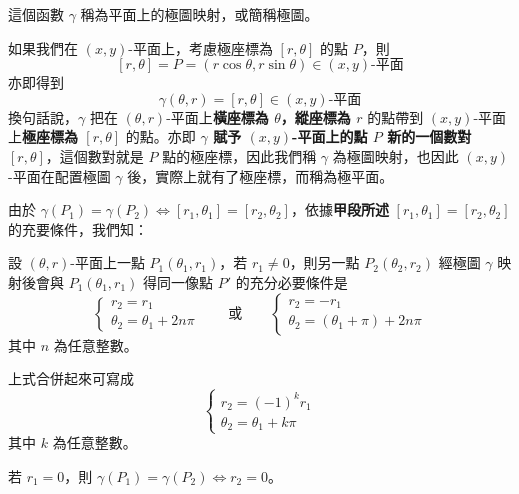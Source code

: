 這個函數 $\gamma$ 稱為平面上的極圖映射，或簡稱極圖。

如果我們在 $(x, y)$-平面上，考慮極座標為 $[r, \theta]$ 的點 $P$，則
\[
[r, \theta] = P = (r\cos\theta, r\sin\theta) \in (x, y)\text{-平面}
\]
亦即得到
\[
\gamma(\theta, r) = [r, \theta] \in (x, y)\text{-平面}
\]
換句話說，$\gamma$ 把在 $(\theta, r)$-平面上\textbf{橫座標為 $\theta$，縱座標為 $r$} 的點帶到 $(x, y)$-平面上\textbf{極座標為 $[r, \theta]$} 的點。亦即 \textbf{$\gamma$ 賦予 $(x, y)$-平面上的點 $P$ 新的一個數對 $[r, \theta]$}，這個數對就是 $P$ 點的極座標，因此我們稱 $\gamma$ 為極圖映射，也因此 $(x, y)$-平面在配置極圖 $\gamma$ 後，實際上就有了極座標，而稱為極平面。

由於 $\gamma(P_1) = \gamma(P_2) \Longleftrightarrow [r_1, \theta_1] = [r_2, \theta_2]$，依據\textbf{甲段所述} $[r_1, \theta_1] = [r_2, \theta_2]$ 的充要條件，我們知：

\medskip
\setcounter{prop}{3}
\begin{prop}\label{prop:b5-1-4b}
設 $(\theta, r)$-平面上一點 $P_1(\theta_1, r_1)$，若 $r_1 \neq 0$，則另一點 $P_2(\theta_2, r_2)$ 經極圖 $\gamma$ 映射後會與 $P_1(\theta_1, r_1)$ 得同一像點 $P'$ 的充分必要條件是
\[
\begin{cases}
r_2 = r_1 \\[4pt]
\theta_2 = \theta_1 + 2n\pi
\end{cases}
\qquad \text{或} \qquad
\begin{cases}
r_2 = -r_1 \\[4pt]
\theta_2 = (\theta_1 + \pi) + 2n\pi
\end{cases}
\]
其中 $n$ 為任意整數。

上式合併起來可寫成
\[
\begin{cases}
r_2 = (-1)^k r_1 \\[4pt]
\theta_2 = \theta_1 + k\pi
\end{cases}
\]
其中 $k$ 為任意整數。

若 $r_1 = 0$，則 $\gamma(P_1) = \gamma(P_2) \Longleftrightarrow r_2 = 0$。
\end{prop}

